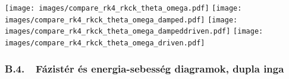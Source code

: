 \begin{multicols}{4}

{\centering\texttt{[image: images/compare\_rk4\_rkck\_theta\_omega.pdf]}}
\label{fig:60}
\hfill
{\centering\texttt{[image: images/compare\_rk4\_rkck\_theta\_omega\_damped.pdf]}}
\label{fig:61}
\hfill
{\centering\texttt{[image: images/compare\_rk4\_rkck\_theta\_omega\_dampeddriven.pdf]}}
\label{fig:62}
\hfill
{\centering\texttt{[image: images/compare\_rk4\_rkck\_theta\_omega\_driven.pdf]}}
\label{fig:63}
\hfill

\end{multicols}

\newpage

\subsubsection*{B.4.\ \ Fázistér és energia-sebesség diagramok, dupla inga}

